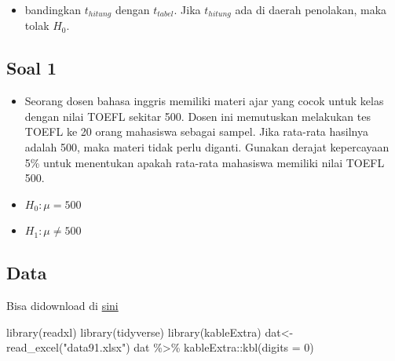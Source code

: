 \documentclass[
  letterpaper,
  DIV=11,
  numbers=noendperiod]{scrartcl}
\newenvironment{Shaded}{\begin{snugshade}}{\end{snugshade}}
\newcommand{\AttributeTok}[1]{\textcolor[rgb]{0.40,0.45,0.13}{#1}}
\newcommand{\DecValTok}[1]{\textcolor[rgb]{0.68,0.00,0.00}{#1}}
\newcommand{\FunctionTok}[1]{\textcolor[rgb]{0.28,0.35,0.67}{#1}}
\newcommand{\NormalTok}[1]{\textcolor[rgb]{0.00,0.23,0.31}{#1}}
\newcommand{\OtherTok}[1]{\textcolor[rgb]{0.00,0.23,0.31}{#1}}
\newcommand{\SpecialCharTok}[1]{\textcolor[rgb]{0.37,0.37,0.37}{#1}}
\newcommand{\StringTok}[1]{\textcolor[rgb]{0.13,0.47,0.30}{#1}}
\providecommand{\tightlist}{%
  \setlength{\itemsep}{0pt}\setlength{\parskip}{0pt}}\usepackage{longtable,booktabs,array}
\begin{document}
\begin{itemize}
\tightlist
\item
  bandingkan \(t_{hitung}\) dengan \(t_{tabel}\). Jika \(t_{hitung}\)
  ada di daerah penolakan, maka tolak \(H_0\).
\end{itemize}

\hypertarget{soal-1}{%
\subsection{Soal 1}\label{soal-1}}

\begin{itemize}
\item
  Seorang dosen bahasa inggris memiliki materi ajar yang cocok untuk
  kelas dengan nilai TOEFL sekitar 500. Dosen ini memutuskan melakukan
  tes TOEFL ke 20 orang mahasiswa sebagai sampel. Jika rata-rata
  hasilnya adalah 500, maka materi tidak perlu diganti. Gunakan derajat
  kepercayaan 5\% untuk menentukan apakah rata-rata mahasiswa memiliki
  nilai TOEFL 500.
\item
  \(H_0: \mu = 500\)
\item
  \(H_1: \mu \neq 500\)
\end{itemize}

\hypertarget{data}{%
\subsection{Data}\label{data}}

Bisa didownload di
\href{https://docs.google.com/spreadsheets/d/1aE74llk9RkTuL2nLsp6WfvK0faz3DGKv/edit?usp=drive_link\&ouid=117760147588370390523\&rtpof=true\&sd=true}{sini}

\begin{Shaded}
\begin{Highlighting}[]
\FunctionTok{library}\NormalTok{(readxl)}
\FunctionTok{library}\NormalTok{(tidyverse)}
\FunctionTok{library}\NormalTok{(kableExtra)}
\NormalTok{dat}\OtherTok{\textless{}{-}}\FunctionTok{read\_excel}\NormalTok{(}\StringTok{"data91.xlsx"}\NormalTok{)}
\NormalTok{dat }\SpecialCharTok{\%\textgreater{}\%}\NormalTok{ kableExtra}\SpecialCharTok{::}\FunctionTok{kbl}\NormalTok{(}\AttributeTok{digits =} \DecValTok{0}\NormalTok{)}
\end{Highlighting}
\end{Shaded}
\end{document}

